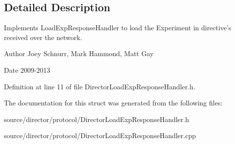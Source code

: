 \subsection{Detailed Description}
Implements Load\-Exp\-Response\-Handler to load the Experiment in directive's received over the network. 

\begin{DoxyAuthor}{Author}
Joey Schnurr, Mark Hammond, Matt Gay 
\end{DoxyAuthor}
\begin{DoxyDate}{Date}
2009-\/2013 
\end{DoxyDate}


Definition at line 11 of file Director\-Load\-Exp\-Response\-Handler.\-h.



The documentation for this struct was generated from the following files\-:\begin{DoxyCompactItemize}
\item 
source/director/protocol/Director\-Load\-Exp\-Response\-Handler.\-h\item 
source/director/protocol/Director\-Load\-Exp\-Response\-Handler.\-cpp\end{DoxyCompactItemize}

